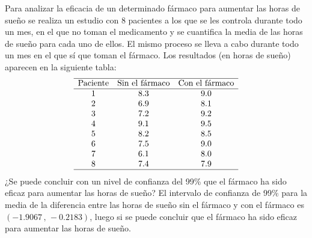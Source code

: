 {Para analizar la eficacia de un determinado fármaco para aumentar las horas de sueño se realiza un estudio con 8 pacientes a los que se les
controla durante todo un mes, en el que no toman el medicamento y se cuantifica la media de las horas de sueño para cada uno de ellos. El
mismo proceso se lleva a cabo durante todo un mes en el que sí que toman el fármaco. Los resultados (en horas de sueño) aparecen en la
siguiente tabla:
\[
\begin{array}{ccc}
\hline
\text{Paciente} & \text{Sin el fármaco} & \text{Con el fármaco} \\
\hline
    1     &        8.3        &         9.0         \\
    2     &        6.9        &         8.1         \\
    3     &        7.2        &         9.2         \\
    4     &        9.1        &         9.5         \\
    5     &        8.2        &         8.5         \\
    6     &        7.5        &         9.0         \\
    7     &        6.1        &         8.0         \\
    8     &        7.4        &         7.9         \\
\hline
\end{array}
\]
¿Se puede concluir con un nivel de confianza del 99\% que el fármaco ha sido eficaz para aumentar las horas de sueño?
}
{El intervalo de confianza de 99\% para la media de la diferencia entre las horas de sueño sin el fármaco y con el fármaco es
$(-1.9067\,,\,-0.2183)$, luego si se puede concluir que el fármaco ha sido eficaz para aumentar las horas de sueño.
}
